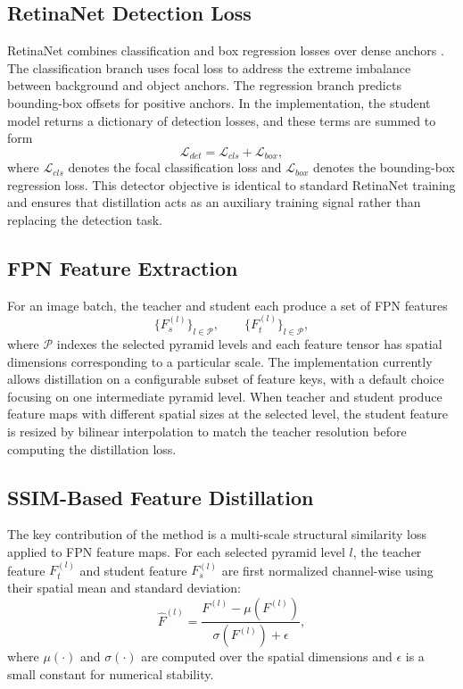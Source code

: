 \documentclass[12pt]{article}
\begin{document}
\subsection{RetinaNet Detection Loss}
RetinaNet combines classification and box regression losses over dense anchors \cite{lin2017focal}. The classification branch uses focal loss to address the extreme imbalance between background and object anchors. The regression branch predicts bounding-box offsets for positive anchors. In the implementation, the student model returns a dictionary of detection losses, and these terms are summed to form
\begin{equation}
\mathcal{L}_{det} = \mathcal{L}_{cls} + \mathcal{L}_{box},
\end{equation}
where $\mathcal{L}_{cls}$ denotes the focal classification loss and $\mathcal{L}_{box}$ denotes the bounding-box regression loss. This detector objective is identical to standard RetinaNet training and ensures that distillation acts as an auxiliary training signal rather than replacing the detection task.

\subsection{FPN Feature Extraction}
For an image batch, the teacher and student each produce a set of FPN features
\begin{equation}
\{F_s^{(l)}\}_{l \in \mathcal{P}}, \qquad \{F_t^{(l)}\}_{l \in \mathcal{P}},
\end{equation}
where $\mathcal{P}$ indexes the selected pyramid levels and each feature tensor has spatial dimensions corresponding to a particular scale. The implementation currently allows distillation on a configurable subset of feature keys, with a default choice focusing on one intermediate pyramid level. When teacher and student produce feature maps with different spatial sizes at the selected level, the student feature is resized by bilinear interpolation to match the teacher resolution before computing the distillation loss.

\subsection{SSIM-Based Feature Distillation}
The key contribution of the method is a multi-scale structural similarity loss applied to FPN feature maps. For each selected pyramid level $l$, the teacher feature $F_t^{(l)}$ and student feature $F_s^{(l)}$ are first normalized channel-wise using their spatial mean and standard deviation:
\begin{equation}
\hat{F}^{(l)} = \frac{F^{(l)} - \mu(F^{(l)})}{\sigma(F^{(l)}) + \epsilon},
\end{equation}
where $\mu(\cdot)$ and $\sigma(\cdot)$ are computed over the spatial dimensions and $\epsilon$ is a small constant for numerical stability.
\end{document}
